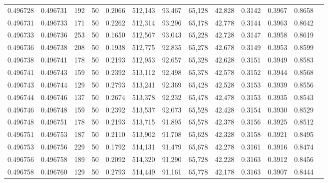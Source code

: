 \begin{tabular}{rrrrrrrrrrrrr}
0.496728 & 0.496731 &   192 &  50 &                                     0.2066 & 512,143 &  93,467 &  65,128 &  42,828 & 0.3142 & 0.3967 & 0.8658 \\
0.496731 & 0.496733 &   171 &  50 &                                     0.2262 & 512,314 &  93,296 &  65,178 &  42,778 & 0.3144 & 0.3963 & 0.8642 \\
0.496733 & 0.496736 &   253 &  50 &                                     0.1650 & 512,567 &  93,043 &  65,228 &  42,728 & 0.3147 & 0.3958 & 0.8619 \\
0.496736 & 0.496738 &   208 &  50 &                                     0.1938 & 512,775 &  92,835 &  65,278 &  42,678 & 0.3149 & 0.3953 & 0.8599 \\
0.496738 & 0.496741 &   178 &  50 &                                     0.2193 & 512,953 &  92,657 &  65,328 &  42,628 & 0.3151 & 0.3949 & 0.8583 \\
0.496741 & 0.496743 &   159 &  50 &                                     0.2392 & 513,112 &  92,498 &  65,378 &  42,578 & 0.3152 & 0.3944 & 0.8568 \\
0.496743 & 0.496744 &   129 &  50 &                                     0.2793 & 513,241 &  92,369 &  65,428 &  42,528 & 0.3153 & 0.3939 & 0.8556 \\
0.496744 & 0.496746 &   137 &  50 &                                     0.2674 & 513,378 &  92,232 &  65,478 &  42,478 & 0.3153 & 0.3935 & 0.8543 \\
0.496746 & 0.496748 &   159 &  50 &                                     0.2392 & 513,537 &  92,073 &  65,528 &  42,428 & 0.3154 & 0.3930 & 0.8529 \\
0.496748 & 0.496751 &   178 &  50 &                                     0.2193 & 513,715 &  91,895 &  65,578 &  42,378 & 0.3156 & 0.3925 & 0.8512 \\
0.496751 & 0.496753 &   187 &  50 &                                     0.2110 & 513,902 &  91,708 &  65,628 &  42,328 & 0.3158 & 0.3921 & 0.8495 \\
0.496753 & 0.496756 &   229 &  50 &                                     0.1792 & 514,131 &  91,479 &  65,678 &  42,278 & 0.3161 & 0.3916 & 0.8474 \\
0.496756 & 0.496758 &   189 &  50 &                                     0.2092 & 514,320 &  91,290 &  65,728 &  42,228 & 0.3163 & 0.3912 & 0.8456 \\
0.496758 & 0.496760 &   129 &  50 &                                     0.2793 & 514,449 &  91,161 &  65,778 &  42,178 & 0.3163 & 0.3907 & 0.8444 \\

\end{tabular}
